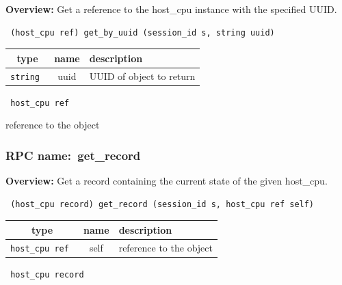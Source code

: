 {\bf Overview:} 
Get a reference to the host\_cpu instance with the specified UUID.

\begin{verbatim} (host_cpu ref) get_by_uuid (session_id s, string uuid)\end{verbatim}



 
\vspace{0.3cm}
\begin{tabular}{|c|c|p{7cm}|}
 \hline
{\bf type} & {\bf name} & {\bf description} \\ \hline
{\tt string } & uuid & UUID of object to return \\ \hline 

\end{tabular}

\vspace{0.3cm}

{\tt 
host\_cpu ref
}


reference to the object
\vspace{0.3cm}
\vspace{0.3cm}
\vspace{0.3cm}
\subsubsection{RPC name:~get\_record}

{\bf Overview:} 
Get a record containing the current state of the given host\_cpu.

\begin{verbatim} (host_cpu record) get_record (session_id s, host_cpu ref self)\end{verbatim}



 
\vspace{0.3cm}
\begin{tabular}{|c|c|p{7cm}|}
 \hline
{\bf type} & {\bf name} & {\bf description} \\ \hline
{\tt host\_cpu ref } & self & reference to the object \\ \hline 

\end{tabular}

\vspace{0.3cm}

{\tt 
host\_cpu record
}


